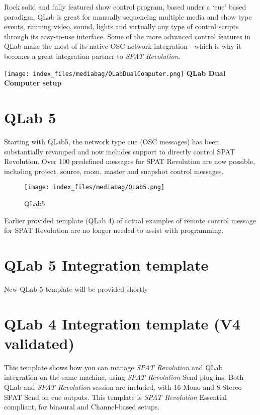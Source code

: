 \documentclass[
  letterpaper,
  DIV=11,
  numbers=noendperiod]{scrreport}
\begin{document}
Rock solid and fully featured show control program, based under a `cue'
based paradigm, QLab is great for manually sequencing multiple media and
show type events, running video, sound, lights and virtually any type of
control scripts through its easy-to-use interface. Some of the more
advanced control features in QLab make the most of its native OSC
network integration - which is why it becomes a great integration
partner to \emph{SPAT Revolution}.

\texttt{[image: index\_files/mediabag/QLabDualComputer.png]} \textbf{QLab
Dual Computer setup}

\hypertarget{qlab-5}{%
\section{QLab 5}\label{qlab-5}}

Starting with QLab5, the network type cue (OSC messages) has been
substantially revamped and now includes support to directly control SPAT
Revolution. Over 100 predefined messages for SPAT Revolution are now
possible, including project, source, room, master and snapshot control
messages.

\begin{figure}

{\centering \texttt{[image: index\_files/mediabag/QLab5.png]}

}

\caption{QLab5}

\end{figure}

Earlier provided template (QLab 4) of actual examples of remote control
message for SPAT Revolution are no longer needed to assist with
programming.

\hypertarget{qlab-5-integration-template}{%
\section{QLab 5 Integration
template}\label{qlab-5-integration-template}}

New QLab 5 template will be provided shortly

\hypertarget{qlab-4-integration-template-v4-validated}{%
\section{QLab 4 Integration template (V4
validated)}\label{qlab-4-integration-template-v4-validated}}

This template shows how you can manage \emph{SPAT Revolution} and QLab
integration on the same machine, using \emph{SPAT Revolution} Send
plug-ins. Both QLab and \emph{SPAT Revolution} session are included,
with 16 Mono and 8 Stereo SPAT Send on cue outputs. This template is
\emph{SPAT Revolution} Essential compliant, for binaural and
Channel-based setups.
\end{document}
